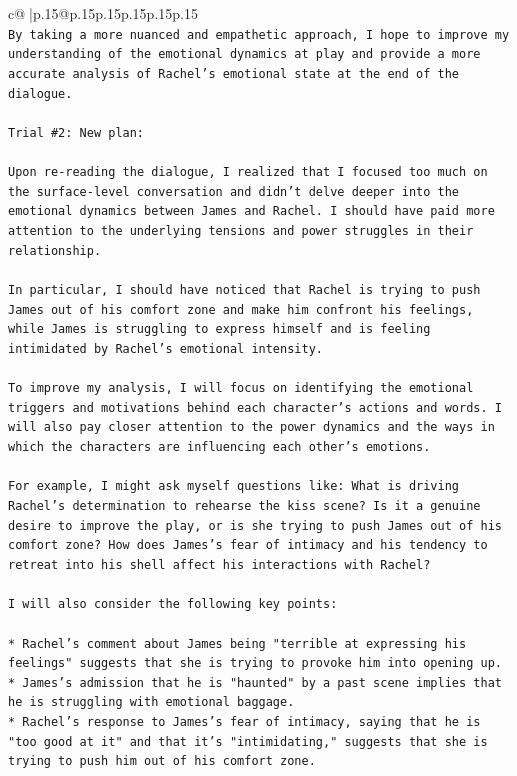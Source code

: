 \documentclass{article}
\begin{document}
{\begin{supertabular}{c@{$\;$}|p{.15\linewidth}@{}p{.15\linewidth}p{.15\linewidth}p{.15\linewidth}p{.15\linewidth}p{.15\linewidth}}
{{{\\ 
\texttt{By taking a more nuanced and empathetic approach, I hope to improve my understanding of the emotional dynamics at play and provide a more accurate analysis of Rachel's emotional state at the end of the dialogue.} \\
\\ 
\texttt{Trial \#2: New plan: } \\
\\ 
\texttt{Upon re{-}reading the dialogue, I realized that I focused too much on the surface{-}level conversation and didn't delve deeper into the emotional dynamics between James and Rachel. I should have paid more attention to the underlying tensions and power struggles in their relationship. } \\
\\ 
\texttt{In particular, I should have noticed that Rachel is trying to push James out of his comfort zone and make him confront his feelings, while James is struggling to express himself and is feeling intimidated by Rachel's emotional intensity. } \\
\\ 
\texttt{To improve my analysis, I will focus on identifying the emotional triggers and motivations behind each character's actions and words. I will also pay closer attention to the power dynamics and the ways in which the characters are influencing each other's emotions. } \\
\\ 
\texttt{For example, I might ask myself questions like: What is driving Rachel's determination to rehearse the kiss scene? Is it a genuine desire to improve the play, or is she trying to push James out of his comfort zone? How does James's fear of intimacy and his tendency to retreat into his shell affect his interactions with Rachel? } \\
\\ 
\texttt{I will also consider the following key points:} \\
\\ 
\texttt{* Rachel's comment about James being "terrible at expressing his feelings" suggests that she is trying to provoke him into opening up.} \\
\texttt{* James's admission that he is "haunted" by a past scene implies that he is struggling with emotional baggage.} \\
\texttt{* Rachel's response to James's fear of intimacy, saying that he is "too good at it" and that it's "intimidating," suggests that she is trying to push him out of his comfort zone.} \\
}}}
\end{supertabular}}
\end{document}
